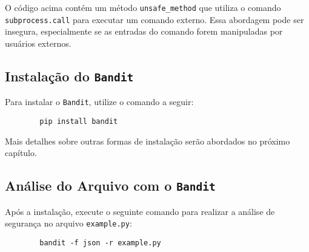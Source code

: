 O código acima contém um método \texttt{unsafe\_method} que utiliza o comando \texttt{subprocess.call} para executar um comando externo. Essa abordagem pode ser insegura, especialmente se as entradas do comando forem manipuladas por usuários externos.

\subsection{Instalação do \texttt{Bandit}}

Para instalar o \texttt{Bandit}, utilize o comando a seguir:

\begin{verbatim}
        pip install bandit
\end{verbatim}

Mais detalhes sobre outras formas de instalação serão abordados no próximo capítulo.

\subsection{Análise do Arquivo com o \texttt{Bandit}}

Após a instalação, execute o seguinte comando para realizar a análise de segurança no arquivo \texttt{example.py}:

\begin{verbatim}
        bandit -f json -r example.py
\end{verbatim}

